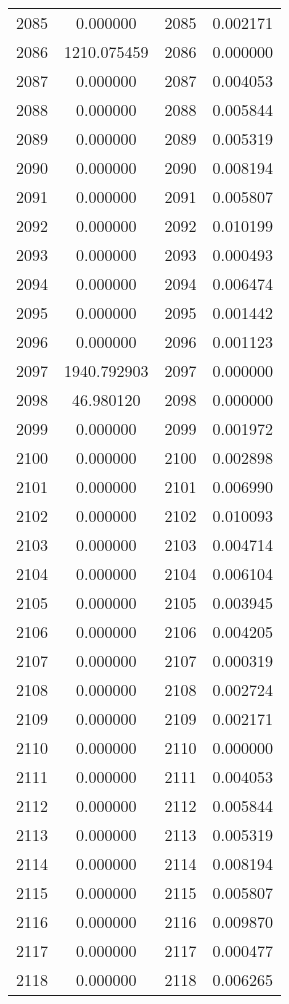 \documentclass[12pt]{article}
\begin{document}
\begin{longtable}{@{}cccc@{}}
2085 & 0.000000 & 2085 & 0.002171 \\
2086 & 1210.075459 & 2086 & 0.000000 \\
2087 & 0.000000 & 2087 & 0.004053 \\
2088 & 0.000000 & 2088 & 0.005844 \\
2089 & 0.000000 & 2089 & 0.005319 \\
2090 & 0.000000 & 2090 & 0.008194 \\
2091 & 0.000000 & 2091 & 0.005807 \\
2092 & 0.000000 & 2092 & 0.010199 \\
2093 & 0.000000 & 2093 & 0.000493 \\
2094 & 0.000000 & 2094 & 0.006474 \\
2095 & 0.000000 & 2095 & 0.001442 \\
2096 & 0.000000 & 2096 & 0.001123 \\
2097 & 1940.792903 & 2097 & 0.000000 \\
2098 & 46.980120 & 2098 & 0.000000 \\
2099 & 0.000000 & 2099 & 0.001972 \\
2100 & 0.000000 & 2100 & 0.002898 \\
2101 & 0.000000 & 2101 & 0.006990 \\
2102 & 0.000000 & 2102 & 0.010093 \\
2103 & 0.000000 & 2103 & 0.004714 \\
2104 & 0.000000 & 2104 & 0.006104 \\
2105 & 0.000000 & 2105 & 0.003945 \\
2106 & 0.000000 & 2106 & 0.004205 \\
2107 & 0.000000 & 2107 & 0.000319 \\
2108 & 0.000000 & 2108 & 0.002724 \\
2109 & 0.000000 & 2109 & 0.002171 \\
2110 & 0.000000 & 2110 & 0.000000 \\
2111 & 0.000000 & 2111 & 0.004053 \\
2112 & 0.000000 & 2112 & 0.005844 \\
2113 & 0.000000 & 2113 & 0.005319 \\
2114 & 0.000000 & 2114 & 0.008194 \\
2115 & 0.000000 & 2115 & 0.005807 \\
2116 & 0.000000 & 2116 & 0.009870 \\
2117 & 0.000000 & 2117 & 0.000477 \\
2118 & 0.000000 & 2118 & 0.006265 \\

\end{longtable}
\end{document}
